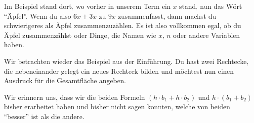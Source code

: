 \documentclass[../../main.tex]{subfiles}
\begin{document}
	Im Beispiel stand dort, wo vorher in unserem Term ein $x$ stand, nun das Wört \enquote{Äpfel}. Wenn du also $6x+3x$ zu $9x$ zusammenfasst, dann machst du schwierigeres als Äpfel zusammenzuzählen. Es ist also vollkommen egal, ob du Äpfel zusammenzählst oder Dinge, die Namen wie $x$, $n$ oder andere Variablen haben.

	
	\begin{example}{}
		Wir betrachten wieder das Beispiel aus der Einführung. Du hast zwei Rechtecke, die nebeneinander gelegt
		ein neues Rechteck bilden und möchtest nun einen Ausdruck für die Gesamtfläche angeben.
		\begin{center}
        \end{center}
		Wir erinnern uns, dass wir die beiden Formeln $(h\cdot b_1 + h\cdot b_2)$ und $h\cdot (b_1+b_2)$
		bisher erarbeitet haben und bisher nicht sagen konnten, welche von beiden \enquote{besser} ist als die
		andere.


\end{example}
\end{document}
